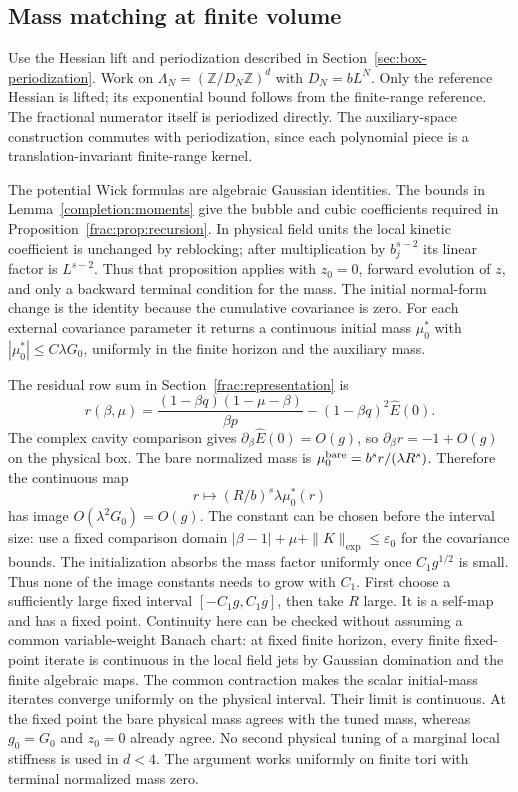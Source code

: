 \documentclass[11pt]{article}
\newcommand{\Z}{\mathbb Z}
\begin{document}
\subsection{Mass matching at finite volume}
Use the Hessian lift and periodization described in
Section~\ref{sec:box-periodization}. Work on \(\Lambda_N=(\Z/D_N\Z)^d\) with \(D_N=bL^N\). Only the reference Hessian is lifted;
its exponential bound follows from the finite-range reference. The
fractional numerator itself is periodized directly. The auxiliary-space
construction commutes with periodization, since each polynomial
piece is a translation-invariant finite-range kernel.

The potential Wick formulas are algebraic Gaussian identities. The
bounds in Lemma~\ref{completion:moments} give the bubble and cubic
coefficients required in Proposition~\ref{frac:prop:recursion}.
In physical field units the local kinetic coefficient is unchanged
by reblocking; after multiplication by \(b_j^{s-2}\) its linear
factor is \(L^{s-2}\). Thus that proposition applies with \(z_0=0\),
forward evolution of \(z\), and only a backward terminal condition
for the mass. The initial normal-form change is the identity because
the cumulative covariance is zero. For each external covariance
parameter it returns a continuous initial mass
\(\mu_0^*\) with \(|\mu_0^*|\le C\lambda G_0\), uniformly in
the finite horizon and the auxiliary mass.

The residual row sum in Section~\ref{frac:representation} is
\[
 r(\beta,\mu)
 =\frac{(1-\beta q)(1-\mu-\beta)}{\beta p}
      -(1-\beta q)^2\widehat E(0).
\]
The complex cavity comparison gives \(\partial_\beta\widehat E(0)=O(g)\),
so \(\partial_\beta r=-1+O(g)\) on the physical box. The bare
normalized mass is
\(\mu_0^{\rm bare}=b^s r/(\lambda R^s)\). Therefore the continuous map
\[
 r\longmapsto (R/b)^s\lambda\mu_0^*(r)
\]
has image \(O(\lambda^2G_0)=O(g)\). The constant can be chosen
before the interval size: use a fixed comparison domain
\(|\beta-1|+\mu+\|K\|_{\exp}\le\varepsilon_0\) for the covariance
bounds. The initialization absorbs the mass factor uniformly once
\(C_1g^{1/2}\) is small. Thus none of the image constants needs to
grow with \(C_1\). First choose a sufficiently large fixed interval
\([-C_1g,C_1g]\), then take \(R\) large.
It is a self-map and has a fixed point. Continuity here can be checked
without assuming a common variable-weight Banach chart: at fixed finite
horizon, every finite fixed-point iterate is continuous in the local
field jets by Gaussian domination and the finite algebraic maps. The
common contraction makes the scalar initial-mass iterates converge
uniformly on the physical interval. Their limit is continuous. At the fixed point the
bare physical mass agrees with the tuned mass, whereas \(g_0=G_0\)
and \(z_0=0\) already agree. No second physical tuning of a marginal
local stiffness is used in \(d<4\). The argument works uniformly
on finite tori with terminal normalized mass zero.
\end{document}
